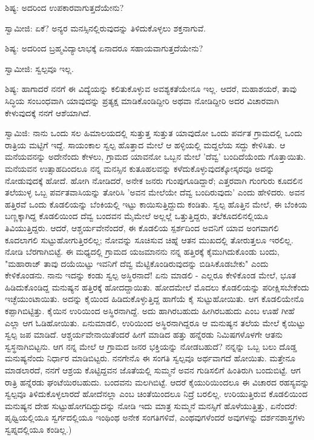 ಶಿಷ್ಯ: ಅದರಿಂದ ಉಪಕಾರವಾಗುತ್ತದೆಯೇನು?

ಸ್ವಾಮೀಜಿ: ಏಕೆ? ಅನ್ಯರ ಮನಸ್ಸಿನಲ್ಲಿರುವುದನ್ನು ತಿಳಿದುಕೊಳ್ಳಲು ಶಕ್ತನಾಗುವೆ.

ಶಿಷ್ಯ: ಅದರಿಂದ ಬ್ರಹ್ಮವಿದ್ಯಾಲಾಭಕ್ಕೆ ಏನಾದರೂ ಸಹಾಯವಾಗುತ್ತದೆಯೇನು?

ಸ್ವಾಮೀಜಿ: ಸ್ವಲ್ಪವೂ ಇಲ್ಲ.

ಶಿಷ್ಯ: ಹಾಗಾದರೆ ನನಗೆ ಈ ವಿದ್ಯೆಯನ್ನು ಕಲಿತುಕೊಳ್ಳುವ ಅವಶ್ಯಕತೆಯೇನೂ ಇಲ್ಲ. ಆದರೆ, ಮಹಾಶಯರೆ, ತಾವು ಸಿದ್ಧಿಯ ಸಂಬಂಧವಾಗಿ ಯಾವುದನ್ನು ಪ್ರತ್ಯಕ್ಷ ಮಾಡಿಕೊಂಡಿದ್ದೀರಿ ಅಥವಾ ನೋಡಿದ್ದೀರಿ ಅದರ ವಿಚಾರವಾಗಿ ಕೇಳುವುದಕ್ಕೆ ನನಗೆ ಆಶೆಯಾಗಿದೆ.

ಸ್ವಾಮಿಜಿ: ನಾನು ಒಂದು ಸಲ ಹಿಮಾಲಯದಲ್ಲಿ ಸುತ್ತುತ್ತ ಸುತ್ತುತ ಯಾವುದೋ ಒಂದು ಪರ್ವತ ಗ್ರಾಮದಲ್ಲಿ ಒಂದು ರಾತ್ರಿಯ ಮಟ್ಟಿಗೆ ಇದ್ದೆ. ಸಾಯಂಕಾಲ ಸ್ವಲ್ಪ ಹೊತ್ತಾದ ಮೇಲೆ ಆ ಹಳ್ಳಿಯಲ್ಲಿ ಮದ್ದಲೆಯ ಸದ್ದು ಕೇಳಿಸಿತು. ಆ ಮನೆಯವನನ್ನು ಅದೇನೆಂದು ಕೇಳಲು, ಗ್ರಾಮದ ಯಾವನೋ ಒಬ್ಬನ ಮೇಲೆ 'ದೆವ್ವ' ಬಂದಿದೆಯೆಂದು ಗೊತ್ತಾಯಿತು. ಮನೆಯವನ ಉತ್ಸಾಹದಿಂದಲೂ ನನ್ನ ಮನಸ್ಸಿನ ಕುತೂಹಲವನ್ನು ಕಳೆದುಕೊಳ್ಳುವುದಕ್ಕೋಸ್ಕರವೂ ಅದನ್ನು ನೋಡುವುದಕ್ಕೆ ಹೋದೆ. ಹೋಗಿ ನೋಡಿದರೆ, ಅನೇಕ ಜನರು ಗುಂಪುಗೂಡಿದ್ದಾರೆ; ಎತ್ತರವಾಗಿ ಗುಂಗುರು ಕೂದಲಿನ ತಲೆಯುಳ್ಳ ಒಬ್ಬ ಪರ್ವತವಾಸಿಯನ್ನು ತೋರಿಸಿ 'ಅವನ ಮೇಲೆಯೇ ದೆವ್ವ ಬಂದಿರುವುದು' ಎಂದು ಹೇಳಿದರು. ಅವನ ಹತ್ತಿರವೆ ಒಂದು ಕೊಡಲಿಯನ್ನು ಬೆಂಕಿಯಲ್ಲಿ ಇಟ್ಟು ಕಾಯಿಸುತ್ತಿದ್ದುದು ಕಂಡಿತು. ಸ್ವಲ್ಪ ಹೊತ್ತಿನ ಮೇಲೆ, ಈ ಬೆಂಕಿಯ ಬಣ್ಣಕ್ಕಾಗಿದ್ದ ಕೊಡಲಿಯಿಂದ ದೆವ್ವ ಬಂದವನ ಮೈಮೇಲೆ ಅಲ್ಲಲ್ಲೆ ಒತ್ತುತ್ತಿದ್ದರು, ತಲೆಕೂದಲಿನಲ್ಲಿಯೂ ತಿವಿಯುತ್ತಿದ್ದರು. ಆದರೆ, ಆಶ್ಚರ್ಯವೇನೆಂದರೆ, ಈ ಕೊಡಲಿಯ ಸ್ಪರ್ಶದಿಂದ ಅವನಿಗೆ ಯಾವ ಅಂಗವಾಗಲಿ ಕೂದಲಾಗಲಿ ಸುಟ್ಟುಹೋಗುತ್ತಿರಲಿಲ್ಲ; ನೋವನ್ನು ಸೂಚಿಸುವ ಚಿಹ್ನೆ ಆತನ ಮುಖದಲ್ಲಿ ತೋರುತ್ತಲೂ ಇರಲಿಲ್ಲ. ನೋಡಿ ಬೆರಗಾಗಿಬಿಟ್ಟೆ. ಈ ಮಧ್ಯದಲ್ಲಿ ಗ್ರಾಮದ ಯಜಮಾನನು ನನ್ನ ಹತ್ತಿರಕ್ಕೆ ಕೈಮುಗಿದುಕೊಂಡು ಬಂದು, "ಮಹಾರಾಜ್ ತಾವು ದಯೆಯಿಟ್ಟು ಇವನಿಗೆ ದೆವ್ವ ಮೆಟ್ಟಿಕೊಂಡಿರುವುದನ್ನು ಬಿಡಿಸಿಕೊಡಬೇಕು" ಎಂದು ಕೇಳಿಕೊಂಡನು. ನಾನು ಇದನ್ನು ಕಂಡು ಸ್ವಲ್ಪ ಅಸ್ಥಿರನಾದೆ! ಏನು ಮಾಡಲಿ - ಎಲ್ಲರೂ ಕೇಳಿಕೊಂಡ ಮೇಲೆ, ಭೂತ ಹಿಡಿದುಕೊಂಡಿದ್ದ ಮನುಷ್ಯನ ಹತ್ತಿರಕ್ಕೆ ಹೋದದ್ದಾಯಿತು. ಹೋದಮೇಲೆ ಮೊದಲು ಕೊಡಲಿಯನ್ನು ಪರೀಕ್ಷಿಸಬೇಕೆಂದು ಇಚ್ಛೆಯುಂಟಾಯಿತು. ಅದನ್ನು ಕೈಯಿಂದ ಹಿಡಿದುಕೊಳ್ಳುತ್ತಿದ್ದ ಹಾಗೆಯೆ ಕೈ ಸುಟ್ಟುಹೋಯಿತು. ಆಗ ಕೊಡಲಿಯೇನೊ ಕಪ್ಪಾಗಿಬಿಟ್ಟಿತ್ತು. ಕೈಯಿನ ಉರಿಯಿಂದ ಅಸ್ಥಿರನಾಗಿದ್ದೆ. ಅದು ಹಾಗಿರಬಹುದು ಹೀಗಿರಬಹುದು ಎಂಬ ಊಹೆ ಗೀಹೆ ಎಲ್ಲಾ ಆಗ ಓಡಿಹೋಯಿತು. ಏನುಮಾಡಲಿ, ಉರಿಯಿಂದ ಅಸ್ಥಿರನಾಗಿದ್ದರೂ ಆ ಮನುಷ್ಯನ ತಲೆಯ ಮೇಲೆ ಕೈಯಿಟ್ಟು ಸ್ವಲ್ಪ ಜಪ ಮಾಡಿದೆ. ಆಶ್ಚರ್ಯವೇನಾಯಿತೆಂದರೆ ಹೀಗೆ ಮಾಡಿದ ಹತ್ತು ಹನ್ನೆರಡು ನಿಮಿಷಗಳೊಳಗೇ ಆತನು ಸ್ವಸ್ಥನಾಗಿಬಿಟ್ಟನು. ಆಗ ನನ್ನ ಮೇಲೆ ಆ ಗ್ರಾಮದ ಜನರ ಭಕ್ತಿಯನ್ನು ನೋಡಬಹುದೆ? ನನ್ನನ್ನು ಒಬ್ಬ ಬಲು ದೊಡ್ಡ ಮನುಷ್ಯನೆಂದು ನಿರ್ಧಾರ ಮಾಡಿಬಿಟ್ಟರು. ನನಗೇನೊ ಈ ಸಂಗತಿ ಸ್ವಲ್ಪವೂ ಅರ್ಥವಾಗದೆ ಹೋಯಿತು. ಮತ್ತೇನೂ ಮಾಡಲಾರದೆ, ನನಗೆ ಆಶ್ರಯ ಕೊಟ್ಟಿದ್ದವನ ಜೊತೆಯಲ್ಲಿ ಸುಮ್ಮನೆ ಅವನ ಗುಡಿಸಲಿಗೆ ಹಿಂತಿರುಗಿ ಬಂದುಬಿಟ್ಟೆ. ಆಗ ರಾತ್ರಿ ಹನ್ನೆರಡು ಘಂಟೆಯಿರಬಹುದು. ಬಂದವನು ಮಲಗಿಬಿಟ್ಟೆ. ಆದರೆ ಕೈಯುರಿಯಿಂದಲೂ ಈ ವಿಚಾರದ ರಹಸ್ಯವನ್ನು ಸ್ವಲ್ಪವೂ ತಿಳಿದುಕೊಳ್ಳಲಾರದೆ ಹೋದೆನಲ್ಲಾ ಎಂಬ ಚಿಂತೆಯಿಂದಲೂ ನಿದ್ರೆ ಬರಲಿಲ್ಲ. ಉರಿಯುತ್ತಿರುವ ಕೊಡಲಿಯಿಂದ ಮನುಷ್ಯನ ದೇಹ ಸುಟ್ಟುಹೋಗದಿದ್ದುದನ್ನು ನೋಡಿ ಇದು ಮಾತ್ರ ಸುಮ್ಮನೆ ಮನಸ್ಸಿಗೆ ಹೊಳೆಯುತ್ತಿತ್ತು, ಏನೆಂದರೆ:  ಪೃಥ್ವಿಯಲ್ಲಿಯೂ ಸ್ವರ್ಗದಲ್ಲಿಯೂ ಇಂಥಿಂಥ ಅನೇಕ ಸಂಗತಿಗಳಿವೆ, ಎಂಥವುಗಳೆಂದರೆ ಅವುಗಳನ್ನು ದರ್ಶನಶಾಸ್ತ್ರಗಳು ಸ್ವಪ್ನದಲ್ಲಿಯೂ ಕಂಡಿಲ್ಲ.)

